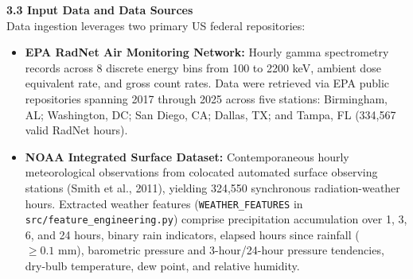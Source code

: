 \documentclass[11pt,a4paper]{article}
\begin{document}
\begin{framed}
\vspace{0.6em}
\noindent\textbf{3.3 Input Data and Data Sources}\\[0.3em]
Data ingestion leverages two primary US federal repositories:
\begin{itemize}
    \item \textbf{EPA RadNet Air Monitoring Network:} Hourly gamma spectrometry records across 8 discrete energy bins from 100 to 2200 keV, ambient dose equivalent rate, and gross count rates. Data were retrieved via EPA public repositories spanning 2017 through 2025 across five stations: Birmingham, AL; Washington, DC; San Diego, CA; Dallas, TX; and Tampa, FL (334,567 valid RadNet hours).
    \item \textbf{NOAA Integrated Surface Dataset:} Contemporaneous hourly meteorological observations from colocated automated surface observing stations (Smith et al., 2011), yielding 324,550 synchronous radiation-weather hours. Extracted weather features (\texttt{WEATHER\_FEATURES} in \texttt{src/feature\_engineering.py}) comprise precipitation accumulation over 1, 3, 6, and 24 hours, binary rain indicators, elapsed hours since rainfall ($\ge 0.1\text{ mm}$), barometric pressure and 3-hour/24-hour pressure tendencies, dry-bulb temperature, dew point, and relative humidity.
\end{itemize}


\end{framed}
\end{document}
